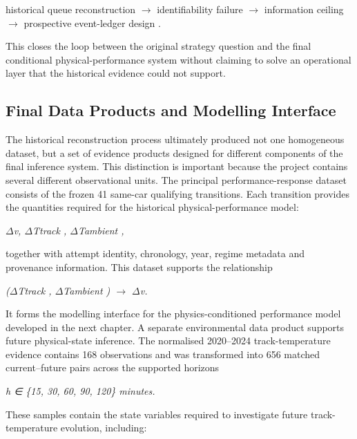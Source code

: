 historical queue reconstruction \ensuremath{\rightarrow} identifiability failure \ensuremath{\rightarrow} information ceiling \ensuremath{\rightarrow} prospective event-ledger design .

This closes the loop between the original strategy question and the final conditional physical-performance system without claiming to solve an operational layer that the historical evidence could not support.

\subsection{Final Data Products and Modelling Interface}
The historical reconstruction process ultimately produced not one homogeneous dataset, but a set of evidence products designed for different components of the final inference system. This distinction is important because the project contains several different observational units. The principal performance-response dataset consists of the frozen 41 same-car qualifying transitions. Each transition provides the quantities required for the historical physical-performance model:

\begin{center}\textit{\ensuremath{\Delta}v,       \ensuremath{\Delta}Ttrack ,     \ensuremath{\Delta}Tambient ,}\end{center}

together with attempt identity, chronology, year, regime metadata and provenance information. This dataset supports the relationship

\begin{center}\textit{(\ensuremath{\Delta}Ttrack , \ensuremath{\Delta}Tambient ) \ensuremath{\rightarrow} \ensuremath{\Delta}v.}\end{center}

It forms the modelling interface for the physics-conditioned performance model developed in the next chapter. A separate environmental data product supports future physical-state inference. The normalised 2020--2024 track-temperature evidence contains 168 observations and was transformed into 656 matched current--future pairs across the supported horizons

\begin{center}\textit{h ∈ \{15, 30, 60, 90, 120\} minutes.}\end{center}

These samples contain the state variables required to investigate future track-temperature evolution, including:

